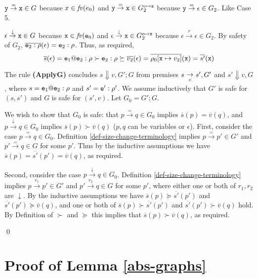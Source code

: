 \documentclass{LMCS}
\newcommand{\fl}{\noindent}
\newcommand{\vair}{\relax}
\newcommand{\eprf}{\qed}
\theoremstyle{definition}\newtheorem{env}[thm]{Environment}
\newcommand{\tosub}[1]{\raisebox{-6.0pt}{$\ \stackrel{\textstyle\to}{\vrule height4.5 pt width0 pt
    depth2.5 pt \smash{\scriptstyle#1}}\ $}}
\begin{document}
\vair
\fl {\em Case 6:} 
${\tt y}\stackrel{=}{\to}{\tt x}\in G$ because $x\in {\it fv}(e_0)$ and
${\tt y}\stackrel{=}{\to}{\tt x}\in G^{\epsilon\mapsto{\tt x}}_2$
because ${\tt y}\stackrel{=}{\to}{\epsilon}\in G_2$. 
Like Case 5.


\vair 
\fl {\em Case 7:}
$\epsilon\stackrel{\downarrow}{\to}{\tt x}\in G$ because ${\tt x}\in {\it fv}({\tt e}_0)$ and
$\epsilon\stackrel{\downarrow}{\to}{\tt x}\in G^{\epsilon\mapsto{\tt x}}_2$
because $\epsilon\stackrel{r}{\to}\epsilon\in G_2$.
By safety of $G_2$, 
$\overline{{\tt e}_2:\rho}(\epsilon)= {\tt e}_2:\rho$.
Thus, as required,
$$ \overline{s}(\epsilon)
= {\tt e}_1{\tt@e}_2:\rho
\succ {\tt e}_2:\rho
\succeq \overline{v_2}(\epsilon)
= \overline{\rho_0[{\tt x}\mapsto v_2]}({\tt x})
= \overline{s'}({\tt x})
$$


\vair
The rule {\bf (ApplyG)} concludes  $s\Downarrow  v, G';G$ 
from premises
$s\tosub{c}s', G'$
and
$s'\Downarrow v,G$, where
$s = {\tt e}_1{\tt@e}_2:\rho$ and $s' = {\tt e}':\rho'$.
We assume inductively 
that $G'$ is safe for $(s,s')$
and $G$ is safe for $(s',v)$.
Let $G_0 = G';G$. 


We wish to show that $G_0$ is safe: that 
$p\stackrel{=}{\to}q\in G_0$ implies
$\overline{s}(p) = \overline{v}(q)$, and
$p\stackrel{\downarrow}{\to}q\in G_0$ implies
$\overline{s}(p)\succ\overline{v}(q)$ ($p, q$ can be variables or $\epsilon$).
First, consider the case $p\stackrel{=}{\to}q\in G_0$.
Definition \ref{def-size-change-terminology} 
implies
$p\stackrel{=}{\to}p'\in G'$
and $p'\stackrel{=}{\to}q\in G$
for some $p'$. Thus by the inductive assumptions we have
$\overline{s}(p) = \overline{s'}(p') = \overline{v}(q)$, as required.



Second, consider the case 
$p\stackrel{\downarrow}{\to}q\in G_0$.
Definition \ref{def-size-change-terminology} 
implies
$p\stackrel{r_1}{\to}p'\in G'$
and $p'\stackrel{r_2}{\to}q\in G$
for some $p'$, where either one or both of $r_1,r_2$ are $\downarrow$. 
By the inductive assumptions we have
$\overline{s}(p) \succeq \overline{s'}(p')$ and 
$\overline{s'}(p') \succeq \overline{v}(q)$, and 
one or both of
$\overline{s}(p) \succ \overline{s'}(p')$ and 
$\overline{s'}(p') \succ \overline{v}(q)$ hold.
By Definition of $\succ$ and $\succeq$ this implies that 
$\overline{s}(p) \succ  \overline{v}(q)$, as required. 


\eprf



\section{Proof of Lemma \ref{abs-graphs}}
\end{document}
